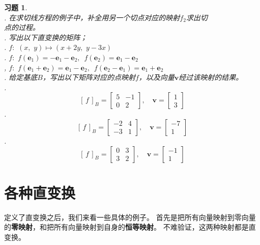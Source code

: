 \documentclass[12pt,UTF8]{ctexbook}
\newtheorem{xt}{习题}[section]
\begin{document}
\begin{xt}
    \mbox{} \\
    . 在求切线方程的例子中，补全用另一个切点对应的映射$f_2$求出切 \\
    \indent 点的过程。\\
    . 写出以下直变换的矩阵；\\
    . $f: \,\, (x,\,\, y) \mapsto (x + 2y,\,\, y - 3x)$ \\
    . $f: \,\, f(\mathbf{e}_1) = -\mathbf{e}_1 - \mathbf{e}_2,\,\,\, f(\mathbf{e}_2) = \mathbf{e}_1 - \mathbf{e}_2$ \\
    , $f: \,\, f(\mathbf{e}_1 + \mathbf{e}_2) = \mathbf{e}_1 - \mathbf{e}_2,\,\,\, f(\mathbf{e}_2 - \mathbf{e}_1) = \mathbf{e}_1 + \mathbf{e}_2$ \\
    . 给定基底$B$，写出以下矩阵对应的点映射$f$，以及向量$\mathbf{v}$经过该映射的结果。\\
    . $$
                [\,f\,]_B = 
                \begin{bmatrix}
                    5 & -1 \\ 0 & 2
                \end{bmatrix},\quad \mathbf{v} = \begin{bmatrix}
                    1\\ 3
                \end{bmatrix}
                $$
    . $$
                [\,f\,]_B = 
                \begin{bmatrix}
                    -2 & 4 \\ -3 & 1
                \end{bmatrix},\quad \mathbf{v} = \begin{bmatrix}
                    -7\\ 1
                \end{bmatrix}
                $$
    . $$
                [\,f\,]_B = 
                \begin{bmatrix}
                    0 & 3 \\ 3 & 2
                \end{bmatrix},\quad \mathbf{v} = \begin{bmatrix}
                    -1\\ 1
                \end{bmatrix}
                $$
\end{xt}

\section{各种直变换}
定义了直变换之后，我们来看一些具体的例子。
首先是把所有向量映射到零向量的\textbf{零映射}，和把所有向量映射到自身的\textbf{恒等映射}。
不难验证，这两种映射都是直变换。
\end{document}
